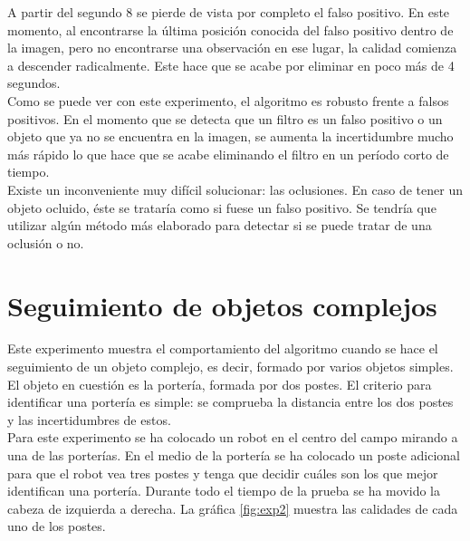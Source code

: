 A partir del segundo 8 se pierde de vista por completo el falso positivo. En este momento, al encontrarse la última posición conocida del falso positivo dentro de la imagen, pero no encontrarse una observación en ese lugar, la calidad comienza a descender radicalmente. Este hace que se acabe por eliminar en poco más de 4 segundos. \\

Como se puede ver con este experimento, el algoritmo es robusto frente a falsos positivos. En el momento que se detecta que un filtro es un falso positivo o un objeto que ya no se encuentra en la imagen, se aumenta la incertidumbre mucho más rápido lo que hace que se acabe eliminando el filtro en un período corto de tiempo. \\

Existe un inconveniente muy difícil solucionar: las oclusiones. En caso de tener un objeto ocluido, éste se trataría como si fuese un falso positivo. Se tendría que utilizar algún método más elaborado para detectar si se puede tratar de una oclusión o no. \\

\section{Seguimiento de objetos complejos}
\label{sec:seguimientobjetoscomplejos}

Este experimento muestra el comportamiento del algoritmo cuando se hace el seguimiento de un objeto complejo, es decir, formado por varios objetos simples. El objeto en cuestión es la portería, formada por dos postes. El criterio para identificar una portería es simple: se comprueba la distancia entre los dos postes y las incertidumbres de estos. \\

Para este experimento se ha colocado un robot en el centro del campo mirando a una de las porterías. En el medio de la portería se ha colocado un poste adicional para que el robot vea tres postes y tenga que decidir cuáles son los que mejor identifican una portería. Durante todo el tiempo de la prueba se ha movido la cabeza de izquierda a derecha. La gráfica \ref{fig:exp2} muestra las calidades de cada uno de los postes. \\

